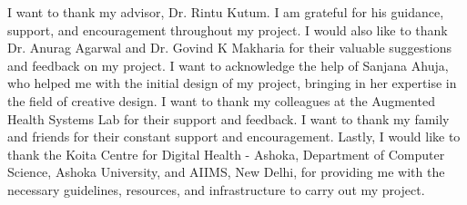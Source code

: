 I want to thank my advisor, Dr. Rintu Kutum. I am grateful for his guidance, support, and encouragement throughout my project. I would also like to thank Dr. Anurag Agarwal and Dr. Govind K Makharia for their valuable suggestions and feedback on my project. I want to acknowledge the help of Sanjana Ahuja, who helped me with the initial design of my project, bringing in her expertise in the field of creative design. I want to thank my colleagues at the Augmented Health Systems Lab for their support and feedback. I want to thank my family and friends for their constant support and encouragement. Lastly, I would like to thank the Koita Centre for Digital Health - Ashoka, Department of Computer Science, Ashoka University, and AIIMS, New Delhi, for providing me with the necessary guidelines, resources, and infrastructure to carry out my project.